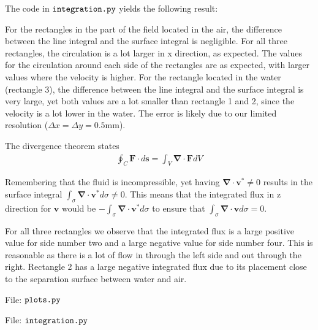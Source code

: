 \documentclass[a4paper,10pt,english]{article}
\begin{document}
\newpage
The code in $\verb|integration.py|$ yields the following result:


For the rectangles in the part of the field located in the air, the difference between the line integral and the surface integral is negligible. For all three rectangles, the circulation is a lot larger in x direction, as expected. The values for the circulation around each side of the rectangles are as expected, with larger values where the velocity is higher. For the rectangle located in the water (rectangle 3), the difference between the line integral and the surface integral is very large, yet both values are a lot smaller than rectangle 1 and 2, since the velocity is a lot lower in the water. The error is likely due to our limited resolution ($\Delta x = \Delta y = 0.5$mm).

The divergence theorem states
\begin{align*}
    \oint_C \bm{F} \cdot d\bm{s}
    = \int_V \bm{\nabla} \cdot \bm{F} dV
\end{align*}

Remembering that the fluid is incompressible, yet having $\bm{\nabla} \cdot \bm{v}^* \neq 0$ results in the surface integral $\int_{\sigma} \bm{\nabla} \cdot \bm{v}^* d\sigma \neq 0$. This means that the integrated flux in z direction for $\bm{v}$ would be $-\int_{\sigma} \bm{\nabla} \cdot \bm{v}^* d\sigma$ to ensure that $\int_{\sigma} \bm{\nabla}\cdot \bm{v} d\sigma = 0$.

For all three rectangles we observe that the integrated flux is a large positive value for side number two and a large negative value for side number four. This is reasonable as there is a lot of flow in through the left side and out through the right. Rectangle 2 has a large negative integrated flux due to its placement close to the separation surface between water and air.

\newpage
File: $\verb|plots.py|$


File: $\verb|integration.py|$

\end{document}
